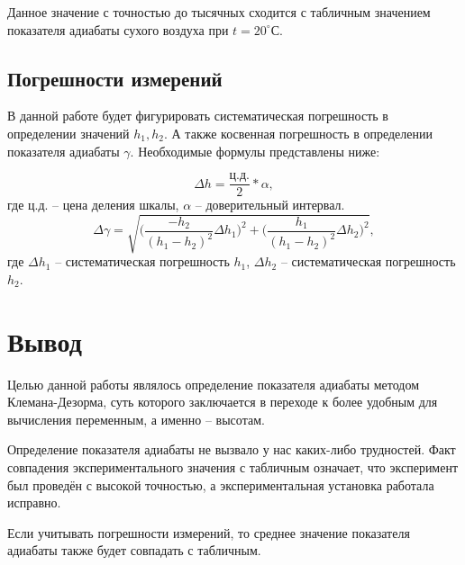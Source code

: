 \documentclass[a4paper,12pt]{article}
\begin{document}
Данное значение с точностью до тысячных сходится с табличным значением показателя адиабаты сухого воздуха при $t = 20^\circ С$.

\newpage
\subsection{Погрешности измерений}
В данной работе будет фигурировать систематическая погрешность в определении значений $h_1, h_2$. А также косвенная погрешность в определении показателя адиабаты $\gamma$. Необходимые формулы представлены ниже:

$$\Delta h = \frac{ц.д.}{2}*\alpha,$$ 
где ц.д. -- цена деления шкалы, $\alpha$ -- доверительный интервал.
\vspace{0.5cm}
$$\Delta\gamma = \sqrt{\bigg(\frac{-h_2}{(h_1-h_2)^2}\Delta h_1\bigg)^2 + \bigg(\frac{h_1}{(h_1-h_2)^2}\Delta h_2\bigg)^2},$$
где $\Delta h_1$ -- систематическая погрешность $h_1$, $\Delta h_2$ -- систематическая погрешность $h_2$.

\newpage
\section{Вывод}
\hspace{\parindent}Целью данной работы являлось определение показателя адиабаты методом Клемана-Дезорма, суть которого заключается в переходе к более удобным для вычисления переменным, а именно -- высотам. 

Определение показателя адиабаты не вызвало у нас каких-либо трудностей. Факт совпадения экспериментального значения с табличным означает, что эксперимент был проведён с высокой точностью, а экспериментальная установка работала исправно. 

Если учитывать погрешности измерений, то среднее значение показателя адиабаты также будет совпадать с табличным. 
\end{document}
